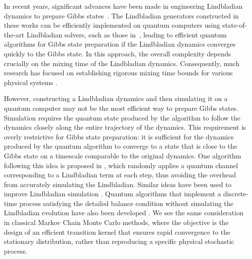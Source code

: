 \documentclass{article}
\theoremstyle{plain}
\theoremstyle{plain}
\theoremstyle{plain}
\theoremstyle{plain}
\theoremstyle{plain}
\theoremstyle{plain}
\theoremstyle{plain}
\begin{document}
In recent years, significant advances have been made in engineering Lindbladian dynamics to prepare Gibbs states~\cite{chen2023quantumthermalstatepreparation,ChenKastoryanoBrandaoGilyen2023,RallWangWocjan2023,DingLiLin2024efficient}.
The Lindbladian generators constructed in these works can be efficiently implemented on quantum computers using state-of-the-art Lindbladian solvers, such as those in~\cite{CleveWang2017, WocjanTemme2023, ChenKastoryanoBrandaoGilyen2023, ChenKastoryanoGilyen2023, LiWang2023, DingLiLin2024simulating,PocrnicSegalWiebe2024,chen2025efficient}, leading to efficient quantum algorithms for Gibbs state preparation if the Lindbladian dynamics converges quickly to the Gibbs state. In this approach, the overall complexity depends crucially on the mixing time of the Lindbladian dynamics. Consequently, much research has focused on establishing rigorous mixing time bounds for various physical systems \cite{temme2014hypercontractivity,ding2024polynomial,bardet2024entropy,alicki2009thermalization,ramkumar2024mixing,KochanowskiAlhambraCapelRouze2024rapid,BardetCapelLiEtAl2023rapid,RouzeFrancaAlhambra2024optimal,capel2024quasi,kastoryano2013quantum,temme2015fast,ChenLiLuYing2024randomized,Rakovszky2024bottlenecks,LiLu2024quantum,Barthel2022solving,Fang2024mixing,DingLiLin2024efficient,DingChenLin2024single,TongZhan2025fast,BakshiLiuMoitraTang2025dobrushin}.


However, constructing a Lindbladian dynamics and then simulating it on a quantum computer may not be the most efficient way to prepare Gibbs states. Simulation requires the quantum state produced by the algorithm to follow the dynamics closely along the entire trajectory of the dynamics. This requirement is overly restrictive for Gibbs state preparation: it is sufficient for the dynamics produced by the quantum algorithm to converge to a state that is close to the Gibbs state on a timescale comparable to the original dynamics. One algorithm following this idea is proposed in \cite{BakshiLiuMoitraTang2025dobrushin}, which randomly applies a quantum channel corresponding to a Lindbladian term at each step, thus avoiding the overhead from accurately simulating the Lindbladian. Similar ideas have been used to improve Lindbladian simulation \cite{ChenLiLuYing2024randomized}. Quantum algorithms that implement a discrete-time process satisfying the detailed balance condition without simulating the Lindbladian evolution have also been developed \cite{GilyenChenDoriguelloKastoryano2024quantum,JiangIrani2024quantum}.
We see the same consideration in classical Markov Chain Monte Carlo methods, where the objective is the design of an efficient transition kernel that ensures rapid convergence to the stationary distribution, rather than reproducing a specific physical stochastic process.
\end{document}
